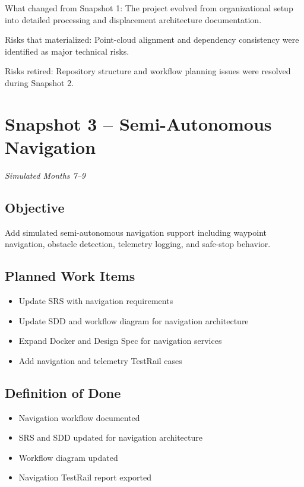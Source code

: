 \documentclass[11pt]{article}
\begin{document}
What changed from Snapshot 1: The project evolved from organizational setup into detailed processing and displacement architecture documentation.

Risks that materialized: Point-cloud alignment and dependency consistency were identified as major technical risks.

Risks retired: Repository structure and workflow planning issues were resolved during Snapshot 2.

\section{Snapshot 3 -- Semi-Autonomous Navigation}

\textit{Simulated Months 7--9}

\subsection{Objective}

Add simulated semi-autonomous navigation support including waypoint navigation, obstacle detection, telemetry logging, and safe-stop behavior.

\subsection{Planned Work Items}

\begin{itemize}[leftmargin=*]
  \item Update SRS with navigation requirements
  \item Update SDD and workflow diagram for navigation architecture
  \item Expand Docker and Design Spec for navigation services
  \item Add navigation and telemetry TestRail cases
\end{itemize}

\subsection{Definition of Done}

\begin{itemize}[leftmargin=*]
  \item Navigation workflow documented
  \item SRS and SDD updated for navigation architecture
  \item Workflow diagram updated
  \item Navigation TestRail report exported
\end{itemize}
\end{document}
